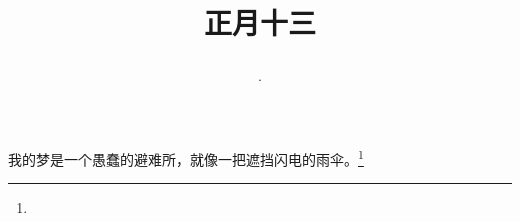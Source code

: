 \title{\date[d=22,m=2,y=2024][year:cn-y,年,month:cn,day:cn,日,·,weekday]·正月十三 }
我的梦是一个愚蠢的避难所，就像一把遮挡闪电的雨伞。\footnote{ }

